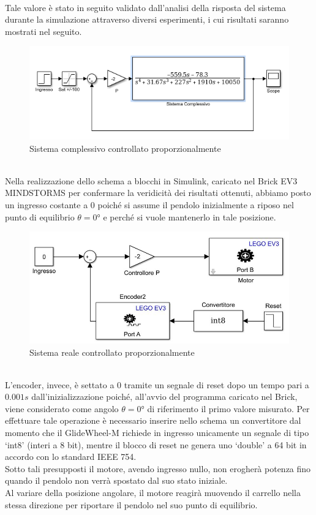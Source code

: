 \\Tale valore è stato in seguito validato dall'analisi della risposta del sistema  durante la simulazione attraverso diversi esperimenti, i cui risultati saranno mostrati nel seguito.
\begin{figure}[ht]
	\centering
	\includegraphics[width=\textwidth]{SisComplessivoPNRetroazionato.PNG}
	\caption{Sistema complessivo controllato proporzionalmente}
	\label{SisComplessivoPNRetroazionato}
\end{figure}
\\Nella realizzazione dello schema a blocchi in Simulink, caricato nel Brick EV3 MINDSTORMS per confermare la veridicità dei risultati ottenuti, abbiamo posto un ingresso costante a 0 poiché si assume il pendolo inizialmente a riposo nel punto di equilibrio $\theta=\ang{0}$ e perché si vuole mantenerlo in tale posizione.
\begin{figure}[ht]
	\centering
	\includegraphics[width=\textwidth]{pendoloReale.jpg}
	\caption{Sistema reale controllato proporzionalmente}
	\label{pendoloReale}
\end{figure}
\\L'encoder, invece, è settato a $0$ tramite un segnale di reset dopo un tempo pari a $0.001s$ dall'inizializzazione poiché, all'avvio del programma caricato nel Brick, viene considerato come angolo $\theta=\ang{0}$ di riferimento il primo valore misurato.
Per effettuare tale operazione è necessario inserire nello schema un convertitore dal momento che il GlideWheel-M richiede in ingresso unicamente un segnale di tipo `int8' (interi a 8 bit), mentre il blocco di reset ne genera uno `double' a 64 bit in accordo con lo standard IEEE 754.\\
Sotto tali presupposti il motore, avendo ingresso nullo, non erogherà potenza fino quando il pendolo non verrà spostato dal suo stato iniziale.\\
Al variare della posizione angolare, il motore reagirà muovendo il carrello nella stessa direzione per riportare il pendolo nel suo punto di equilibrio.


